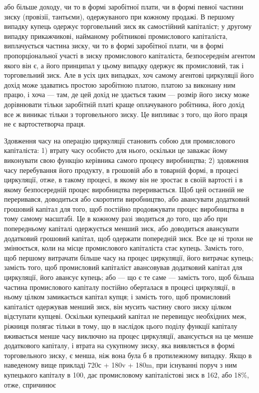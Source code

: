 \parcont{}  %
або більше доходу, чи то в формі заробітної плати, чи в формі
певної частини зиску (провізії, тантьєми), одержуваного при
кожному продажі. В першому випадку купець одержує торговельний
зиск як самостійний капіталіст; у другому випадку прикажчикові,
найманому робітникові промислового капіталіста, виплачується
частина зиску, чи то в формі заробітної плати, чи
в формі пропорціональної участі в зиску промислового капіталіста,
безпосереднім агентом якого він є, а його принципал
у цьому випадку одержує як промисловий, так і торговельний
зиск. Але в усіх цих випадках, хоч самому агентові циркуляції
його дохід може здаватись простою заробітною платою, платою
за виконану ним працю, і хоча — там, де цей дохід не здається
таким — розмір його зиску може дорівнювати тільки заробітній
платі краще оплачуваного робітника, його дохід все ж виникає
тільки з торговельного зиску. Це випливає з того, що його
праця не є вартостетворча праця.

Здовження часу на операцію циркуляції становить собою
для промислового капіталіста: 1) втрату часу особисто для нього,
оскільки це заважає йому виконувати свою функцію керівника
самого процесу виробництва; 2) здовження часу перебування
його продукту, в грошовій або в товарній формі, в процесі циркуляції,
отже, в такому процесі, в якому він не зростає в своїй
вартості і в якому безпосередній процес виробництва переривається.
Щоб цей останній не переривався, доводиться або
скоротити виробництво, або авансувати додатковий грошовий
капітал для того, щоб постійно продовжувати процес виробництва
в тому самому масштабі. Це в кожному разі зводиться
до того, що або при попередньому капіталі одержується менший
зиск, або доводиться авансувати додатковий грошовий
капітал, щоб одержати попередній зиск. Все це ні трохи не
змінюється, коли на місце промислового капіталіста стає купець.
Замість того, щоб першому витрачати більше часу на процес
циркуляції, його витрачає купець; замість того, щоб промисловий
капіталіст авансовував додатковий капітал для циркуляції,
його авансує купець; або — що є те саме — замість того,
щоб більша частина промислового капіталу постійно оберталася
в процесі циркуляції, в ньому цілком замикається капітал
купця; і замість того, щоб промисловий капіталіст одержував
менший зиск, він мусить частину свого зиску цілком відступати
купцеві. Оскільки купецький капітал не перевищує необхідних
меж, ріжниця полягає тільки в тому, що в наслідок
цього поділу функції капіталу вживається менше часу виключно
на процес циркуляції, авансується на це менше додаткового
капіталу, і втрата на сукупному зиску, яка виявляється в формі
торговельного зиску, є менша, ніж вона була б в протилежному
випадку. Якщо в наведеному вище прикладі 720с + 180v + 180m,
при існуванні поруч з ним купецького капіталу в 100, дає промисловому
капіталістові зиск в 162, або 18\%, отже, спричинює
\parbreak{}  %
